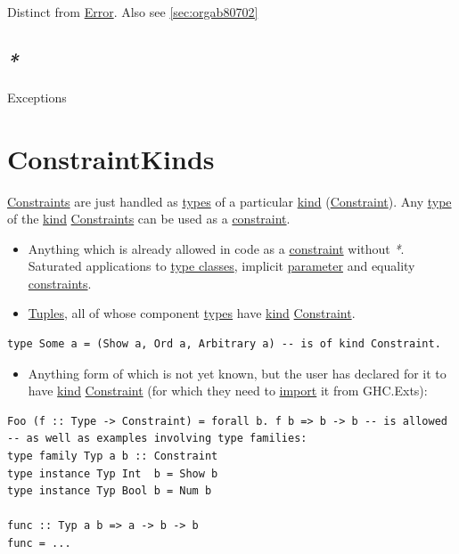 \documentclass[a4paper,14pt,oneside]{book}
\begin{document}
Distinct from \hyperref[orgc3d12d2]{Error}. Also see \ref{sec:orgab80702}

\section{\emph{*}}
\label{sec:orgf69e068}

\label{org9d09c7b}Exceptions

\chapter{\label{orgf65992f}ConstraintKinds}
\label{sec:org958b0c5}
\hyperref[org6b55b0c]{Constraints} are just handled as \hyperref[org787c804]{types} of a particular \hyperref[org11542f9]{kind} (\hyperref[org3e9130e]{Constraint}).
Any \hyperref[orgd9ae293]{type} of the \hyperref[org11542f9]{kind} \hyperref[org6b55b0c]{Constraints} can be used as a \hyperref[org3e9130e]{constraint}.
\begin{itemize}
\item Anything which is already allowed in code as a \hyperref[org3e9130e]{constraint} without \emph{*}. Saturated applications to \hyperref[org919cf40]{type classes}, implicit \hyperref[org5d08d01]{parameter} and equality \hyperref[org6b55b0c]{constraints}.
\item \hyperref[org5a0a8f1]{Tuples}, all of whose component \hyperref[org787c804]{types} have \hyperref[org11542f9]{kind} \hyperref[org3e9130e]{Constraint}.
\end{itemize}
\begin{verbatim}
type Some a = (Show a, Ord a, Arbitrary a) -- is of kind Constraint.
\end{verbatim}
\begin{itemize}
\item Anything form of which is not yet known, but the user has declared for it to have \hyperref[org11542f9]{kind} \hyperref[org3e9130e]{Constraint} (for which they need to \hyperref[org9c85e5e]{import} it from GHC.Exts):
\end{itemize}
\begin{verbatim}
Foo (f :: Type -> Constraint) = forall b. f b => b -> b -- is allowed
-- as well as examples involving type families:
type family Typ a b :: Constraint
type instance Typ Int  b = Show b
type instance Typ Bool b = Num b

func :: Typ a b => a -> b -> b
func = ...
\end{verbatim}
\end{document}

